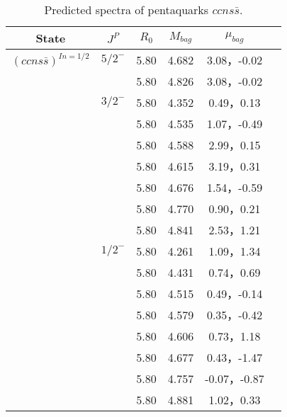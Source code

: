 \documentclass[prd,twocolumn,floatfix,nofootinbib]{revtex4}
\begin{document}
  \begin{table*}[!htbp]
    \caption{Predicted spectra of pentaquarks $ccns\bar{s}$.}
    \begin{tabular}{cccccc}
        \hline\hline
  {\rm State} &$J^{P}$ &$R_{0}$ &$M_{bag}$ &$\mu_{bag}$  \\ \hline
  ${(ccns\bar{s})}^{I{n}=1/2}$
            &${5/2}^{-}$     &5.80   &4.682 &3.08，-0.02  \\
                         &$ $     &5.80   &4.826 &3.08，-0.02 \\
            &${3/2}^{-}$     &5.80   &4.352 &0.49，0.13 \\
                         &$ $     &5.80   &4.535 &1.07，-0.49  \\
                         &$ $     &5.80   &4.588 &2.99，0.15  \\
                         &$ $     &5.80   &4.615 &3.19，0.31 \\
                         &$ $     &5.80   &4.676 &1.54，-0.59  \\
                         &$ $     &5.80   &4.770 &0.90，0.21  \\
                         &$ $     &5.80   &4.841 &2.53，1.21  \\
            &${1/2}^{-}$     &5.80   &4.261 &1.09，1.34  \\
                         &$ $     &5.80   &4.431 &0.74，0.69  \\
                         &$ $     &5.80   &4.515 &0.49，-0.14  \\
                         &$ $     &5.80   &4.579 &0.35，-0.42  \\
                         &$ $     &5.80   &4.606 &0.73，1.18  \\
                         &$ $     &5.80   &4.677 &0.43，-1.47  \\
                         &$ $     &5.80   &4.757 &-0.07，-0.87  \\
                         &$ $     &5.80   &4.881 &1.02，0.33 \\
        \hline\hline
    \end{tabular}
\end{table*}
\end{document}
